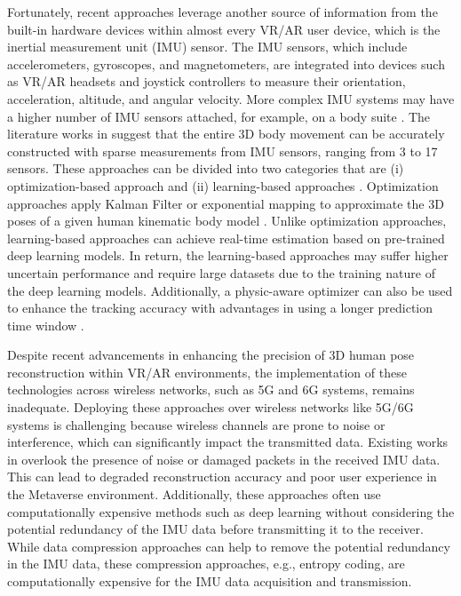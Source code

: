 \documentclass[conference, 10pt]{IEEEtran}
\begin{document}
Fortunately, recent approaches leverage another source of information from the built-in hardware devices within almost every VR/AR user device, which is the inertial measurement unit (IMU) sensor. The IMU sensors, which include accelerometers, gyroscopes, and magnetometers, are integrated into devices such as VR/AR headsets and joystick controllers to measure their orientation, acceleration, altitude, and angular velocity. More complex IMU systems may have a higher number of IMU sensors attached, for example, on a body suite \cite{xsens2023}. The literature works in \cite{von2017sparse, huang2018deep, yi2022physical, xsens2023} suggest that the entire 3D body movement can be accurately constructed with sparse measurements from IMU sensors, ranging from 3 to 17 sensors. These approaches can be divided into two categories that are (i) optimization-based approach \cite{von2017sparse, xsens2023} and (ii) learning-based approaches \cite{huang2018deep, yi2022physical}. Optimization approaches apply Kalman Filter \cite{xsens2023} or exponential mapping \cite{von2017sparse} to approximate the 3D poses of a given human kinematic body model \cite{loper2023smpl}.  Unlike optimization approaches, learning-based approaches can achieve real-time estimation based on pre-trained deep learning models. In return, the learning-based approaches may suffer higher uncertain performance and require large datasets due to the training nature of the deep learning models. Additionally, a physic-aware optimizer can also be used to enhance the tracking accuracy with advantages in using a longer prediction time window \cite{yi2022physical}.

Despite recent advancements in enhancing the precision of 3D human pose reconstruction within VR/AR environments, the implementation of these technologies across wireless networks, such as 5G and 6G systems, remains inadequate. Deploying these approaches over wireless networks like 5G/6G systems is challenging because wireless channels are prone to noise or interference, which can significantly impact the transmitted data. Existing works in \cite{von2017sparse, huang2018deep, yi2022physical, xsens2023} overlook the presence of noise or damaged packets in the received IMU data. This can lead to degraded reconstruction accuracy and poor user experience in the Metaverse environment. Additionally, these approaches often use computationally expensive methods such as deep learning without considering the potential redundancy of the IMU data before transmitting it to the receiver. While data compression approaches can help to remove the potential redundancy in the IMU data, these compression approaches, e.g., entropy coding, are computationally expensive for the IMU data acquisition and transmission. 
\end{document}

